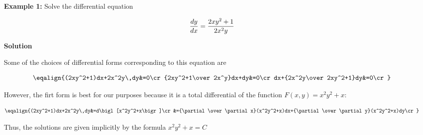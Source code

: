 \nopagenumbers
{\bf Example 1:} Solve the differential equation

$${dy\over dx}={2xy^2+1\over 2x^2y}$$

\vskip 10pt
{\bf Solution}

\vskip 6pt
Some of the choices of differential forms corresponding to this equation are

$$\eqalign{(2xy^2+1)dx+2x^2y\,dy&=0\cr
	{2xy^2+1\over 2x^y}dx+dy&=0\cr
	dx+{2x^2y\over 2xy^2+1}dy&=0\cr}$$

However, the firt form is best for our purposes because it is a total differential of the function $F(x,y)=x^2y^2+x$:

$$\eqalign{(2xy^2+1)dx+2x^2y\,dy&=d\bigl[x^2y^2+x\bigr]\cr
	&={\partial\over\partial x}(x^2y^2+x)dx+{\partial\over\partial y}(x^2y^2+x)dy\cr}$$

Thus, the solutions are given implicitly by the formula $x^2y^2+x=C$

\vfill\eject
\bye
